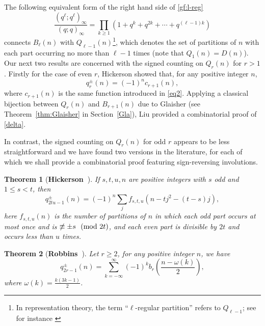 \documentclass[12pt,reqno]{amsart}
\newtheorem{Theorem}{Theorem}[section]
\numberwithin{equation}{section}
\newcommand{\tpmod}[1]{\mkern 12mu(\textup{mod}\mkern 6mu #1)}
\begin{document}
	The following equivalent form of the right hand side of \eqref{gf:l-reg} 
	$$\frac{(q^{\ell};q^{\ell})_{\infty}}{(q;q)_{\infty}}=\prod_{k\ge 1}(1+q^k+q^{2k}+\cdots+q^{(\ell-1)k})$$
	connects $B_{\ell}(n)$ with $Q_{\ell-1}(n)$\footnote{In representation theory, the term ``$\ell$-regular partition'' refers to $Q_{\ell-1}$; see for instance \cite[p.~251]{JK1981}}, which denotes the set of partitions of $n$ with each part occurring no more than $\ell-1$ times (note that $Q_1(n)=D(n)$). Our next two results are concerned with the signed counting on $Q_r(n)$ for $r>1$. Firstly for the case of even $r$, Hickerson \cite{hickerson1973} showed that, for any positive integer $n$, 
	\begin{equation}
		q^{\pm}_{r}(n)=(-1)^{n}c_{r+1}(n),
		\label{delta}
	\end{equation}
	where $c_{r+1}(n)$ is the same function introduced in \eqref{eq2}. Applying a classical bijection between $Q_{r}(n)$ and $B_{r+1}(n)$ due to Glaisher \cite{glaisher1883} (see Theorem~\ref{thm:Glaisher} in Section~\ref{Gla}), Liu \cite[Theorem 1.4]{liu2025} provided a combinatorial proof of \eqref{delta}.

	In contrast, the signed counting on $Q_r(n)$ for odd $r$ appears to be less straightforward and we have found two versions in the literature, for each of which we shall provide a combinatorial proof featuring sign-reversing involutions.
	
	\begin{Theorem}[\textbf{Hickerson~\cite{hickerson1978}}]
		If $s,t,u,n$ are positive integers with $s$ odd and $1\leq s<t$, then
		\begin{equation}
			q^{\pm}_{2tu-1}(n)=(-1)^{n}\sum_{j}f_{s,t,u}(n-tj^2-(t-s)j),
			\label{eq5}
		\end{equation}
		here $f_{s,t,u}(n)$ is the number of partitions of $n$ in which each odd part occurs at most once and is $\not\equiv \pm s \tpmod{2t}$, and each even part is divisible by $2t$ and occurs less than $u$ times.
		\label{thm2}
	\end{Theorem}
	
	\begin{Theorem}[\textbf{Robbins~\cite{robbins2002}}]
		Let $r\geq2$, for any positive integer $n$, we have
		\begin{equation}
			q^{\pm}_{2r-1}(n)=\sum_{k=-\infty}^{\infty}(-1)^{k}b_{r}{(\frac{n-\omega(k)}{2})},
			\label{eq6}
		\end{equation}
		where $\omega(k)=\frac{k(3k-1)}{2}$.
		\label{thm3}
	\end{Theorem}
	
\end{document}
